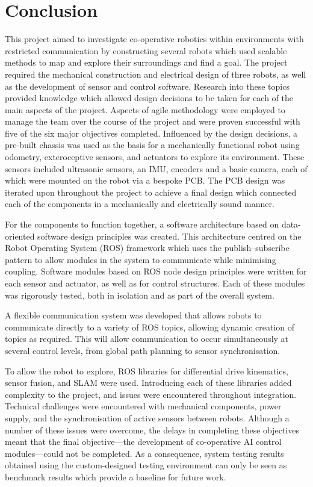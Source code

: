 
\chapter{Conclusion}\label{conclusion}
This project aimed to investigate co-operative robotics within environments
with restricted communication by constructing several robots
which used scalable methods to map and explore their surroundings and find
a goal. The project required the mechanical construction and
electrical design of three robots, as well as the development of sensor and
control software.  Research into these topics provided knowledge which allowed
design decisions to be taken for each of the main aspects of the project.
Aspects of agile methodology were employed to manage the team over the course of
the project and were proven successful with five of the six major objectives
completed. Influenced by the design decisions, a pre-built chassis was
used as the basis for a mechanically functional robot using odometry,
exteroceptive sensors, and actuators to explore its environment. These sensors
included ultrasonic sensors, an IMU, encoders and a basic
camera, each of which were mounted on the robot via a bespoke PCB. The PCB
design was iterated upon throughout the project to achieve a final design
which connected each of the components in a mechanically and
electrically sound manner.

For the components to function together, a software
architecture based on data-oriented software design principles was
created. This architecture centred on the Robot Operating System (ROS)
framework which uses the publish--subscribe pattern to allow modules in the
system to communicate while minimising coupling. Software modules based on
ROS node design principles were written for each sensor and actuator, as well
as for control structures. Each of these modules was rigorously tested, both
in isolation and as part of the overall system.

A flexible communication system was developed that allows robots to communicate
directly to a variety of ROS topics, allowing dynamic creation of topics as required.
This will allow communication to occur simultaneously at several control levels,
from global path planning to sensor synchronisation.

To allow the robot to explore, ROS libraries for differential drive kinematics,
sensor fusion, and SLAM were used.
Introducing each of these libraries added complexity to the project, and
issues were encountered throughout integration. Technical challenges were
encountered with mechanical components, power supply, and the synchronisation of
active sensors between robots. Although a number of these
issues were overcome, the delays in completing these objectives meant that
the final objective---the development of co-operative AI control modules---could
not be completed. As a consequence, system testing results obtained using the
custom-designed testing environment can only be seen as benchmark results which
provide a baseline for future work.

